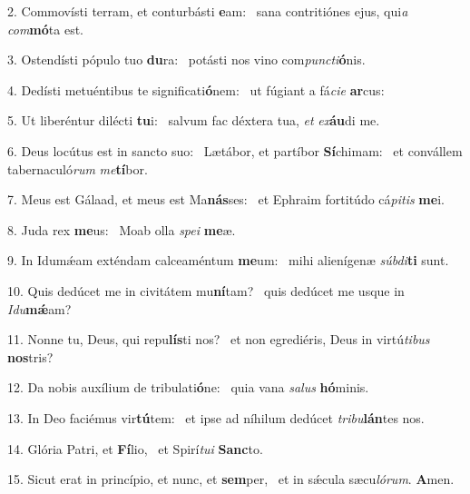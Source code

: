 2. Commovísti terram, et conturbásti \textbf{e}am: \ast\  sana contritiónes ejus, qui\textit{a} \textit{com}\textbf{mó}ta est.\

3. Ostendísti pópulo tuo \textbf{du}ra: \ast\  potásti nos vino com\textit{punc}\textit{ti}\textbf{ó}nis.\

4. Dedísti metuéntibus te significati\textbf{ó}nem: \ast\  ut fúgiant a fá\textit{ci}\textit{e} \textbf{ar}cus:\

5. Ut liberéntur dilécti \textbf{tu}i: \ast\  salvum fac déxtera tua, \textit{et} \textit{ex}\textbf{áu}di me.\

6. Deus locútus est in sancto suo: \dag\  Lætábor, et partíbor \textbf{Sí}chimam: \ast\  et convállem tabernaculó\textit{rum} \textit{me}\textbf{tí}bor.\

7. Meus est Gálaad, et meus est Ma\textbf{nás}ses: \ast\  et Ephraim fortitúdo cá\textit{pi}\textit{tis} \textbf{me}i.\

8. Juda rex \textbf{me}us: \ast\  Moab olla \textit{spe}\textit{i} \textbf{me}æ.\

9. In Idumǽam exténdam calceaméntum \textbf{me}um: \ast\  mihi alienígenæ \textit{súb}\textit{di}\textbf{ti} sunt.\

10. Quis dedúcet me in civitátem mu\textbf{ní}tam? \ast\  quis dedúcet me usque in \textit{I}\textit{du}\textbf{mǽ}am?\

11. Nonne tu, Deus, qui repu\textbf{lís}ti nos? \ast\  et non egrediéris, Deus in virtú\textit{ti}\textit{bus} \textbf{nos}tris?\

12. Da nobis auxílium de tribulati\textbf{ó}ne: \ast\  quia vana \textit{sa}\textit{lus} \textbf{hó}minis.\

13. In Deo faciémus vir\textbf{tú}tem: \ast\  et ipse ad níhilum dedúcet \textit{tri}\textit{bu}\textbf{lán}tes nos.\

14. Glória Patri, et \textbf{Fí}lio, \ast\  et Spirí\textit{tu}\textit{i} \textbf{Sanc}to.\

15. Sicut erat in princípio, et nunc, et \textbf{sem}per, \ast\  et in sǽcula sæcu\textit{ló}\textit{rum}. \textbf{A}men.\

